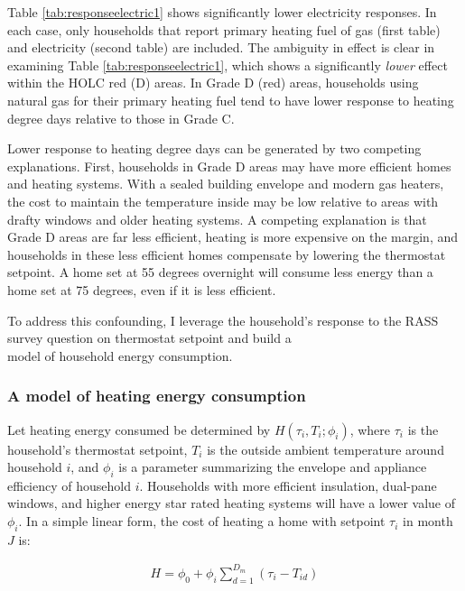 \documentclass[
]{article}
\begin{document}
Table \ref{tab:responseelectric1} shows significantly lower electricity
responses. In each case, only households that report primary heating
fuel of gas (first table) and electricity (second table) are included.
The ambiguity in effect is clear in examining Table
\ref{tab:responseelectric1}, which shows a significantly \emph{lower}
effect within the HOLC red (D) areas. In Grade D (red) areas, households
using natural gas for their primary heating fuel tend to have lower
response to heating degree days relative to those in Grade C.

Lower response to heating degree days can be generated by two competing
explanations. First, households in Grade D areas may have more efficient
homes and heating systems. With a sealed building envelope and modern
gas heaters, the cost to maintain the temperature inside may be low
relative to areas with drafty windows and older heating systems. A
competing explanation is that Grade D areas are far less efficient,
heating is more expensive on the margin, and households in these less
efficient homes compensate by lowering the thermostat setpoint. A home
set at 55 degrees overnight will consume less energy than a home set at
75 degrees, even if it is less efficient.

To address this confounding, I leverage the household's response to the
RASS survey question on thermostat setpoint and build a\\
model of household energy consumption.

\hypertarget{a-model-of-heating-energy-consumption}{%
\subsubsection{A model of heating energy
consumption}\label{a-model-of-heating-energy-consumption}}

Let heating energy consumed be determined by \(H(\tau_i, T_i; \phi_i)\),
where \(\tau_i\) is the household's thermostat setpoint, \(T_i\) is the
outside ambient temperature around household \(i\), and \(\phi_i\) is a
parameter summarizing the envelope and appliance efficiency of household
\(i\). Households with more efficient insulation, dual-pane windows, and
higher energy star rated heating systems will have a lower value of
\(\phi_i\). In a simple linear form, the cost of heating a home with
setpoint \(\tau_i\) in month \(J\) is:

\begin{eqnarray}
H = \phi_0 + \phi_i \sum_{d=1}^{D_m}(\tau_i - T_{id}) \label{eq:hdd1}
\end{eqnarray}
\end{document}
